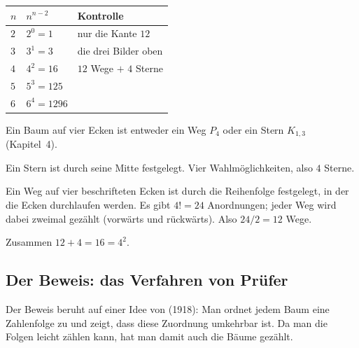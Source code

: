 \begin{merksatz}
\begin{center}
\renewcommand{\arraystretch}{1.42}
\begin{tabular}{@{}P{1.2cm}P{1.8cm}P{4.4cm}@{}}
\toprule
$n$ & $n^{n-2}$ & \textbf{Kontrolle}\\
\midrule
$2$ & $2^0 = 1$ & nur die Kante $12$\\
$3$ & $3^1 = 3$ & die drei Bilder oben\\
$4$ & $4^2 = 16$ & $12$ Wege $+$ $4$ Sterne\\
$5$ & $5^3 = 125$ & \\
$6$ & $6^4 = 1296$ & \\
\bottomrule
\end{tabular}
\end{center}

Ein Baum auf vier Ecken ist entweder ein Weg $P_4$ oder ein Stern $K_{1,3}$ (Kapitel~4).

 Ein Stern ist durch seine Mitte festgelegt. Vier Wahlmöglichkeiten, also $4$ Sterne.

 Ein Weg auf vier beschrifteten Ecken ist durch die Reihenfolge festgelegt, in der die Ecken durchlaufen werden. Es gibt $4! = 24$ Anordnungen; jeder Weg wird dabei zweimal gezählt (vorwärts und rückwärts). Also $24/2 = 12$ Wege.

Zusammen $12 + 4 = 16 = 4^2$. \checkmark
\end{merksatz}

\subsection*{Der Beweis: das Verfahren von Prüfer}

Der Beweis beruht auf einer Idee von  (1918): Man ordnet jedem Baum eine Zahlenfolge zu und zeigt, dass diese Zuordnung umkehrbar ist. Da man die Folgen leicht zählen kann, hat man damit auch die Bäume gezählt.

